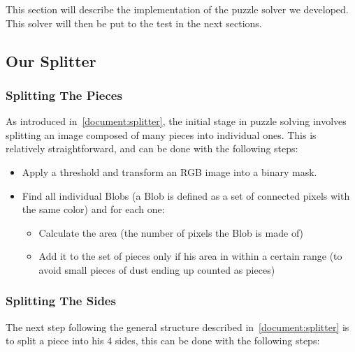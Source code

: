 \documentclass{article}
\begin{document}
This section will describe the implementation of the puzzle solver we developed.
This solver will then be put to the test in the next sections.

\subsection{Our Splitter}

\subsubsection{Splitting The Pieces}

As introduced in~\cref{document:splitter},  the initial stage in puzzle solving involves
splitting an image composed of many pieces into individual ones.
This is relatively straightforward, and can be done with the following steps:

\begin{itemize}
  \item Apply a threshold and transform an RGB image into a binary mask.
  \item Find all individual Blobs
  (a Blob is defined as a set of connected pixels with the same color) and for each one:

  \begin{itemize}
  \item Calculate the area (the number of pixels the Blob is made of)

  \item Add it to the set of pieces only if his area in within a certain range (to avoid small pieces of dust ending up counted as pieces)

  \end{itemize}

\end{itemize}

\subsubsection{Splitting The Sides}

The next step following the general structure described in~\cref{document:splitter}
is to split a piece into
his 4 sides, this can be done with the following steps:
\end{document}
